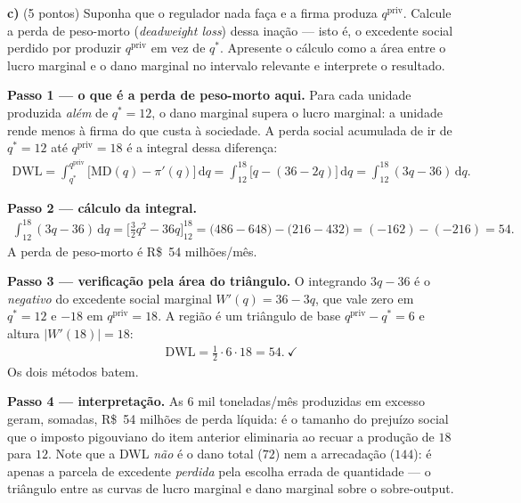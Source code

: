 \textbf{c)} (5 pontos) Suponha que o regulador nada faça e a firma produza $q^{\text{priv}}$. Calcule a perda de peso-morto (\emph{deadweight loss}) dessa inação — isto é, o excedente social perdido por produzir $q^{\text{priv}}$ em vez de $q^{*}$. Apresente o cálculo como a área entre o lucro marginal e o dano marginal no intervalo relevante e interprete o resultado.
\resolucaobox{5.5cm}
\begin{solucao}
\textbf{Passo 1 — o que é a perda de peso-morto aqui.} Para cada unidade produzida \emph{além} de $q^{*}=12$, o dano marginal supera o lucro marginal: a unidade rende menos à firma do que custa à sociedade. A perda social acumulada de ir de $q^{*}=12$ até $q^{\text{priv}}=18$ é a integral dessa diferença:
\begin{align*}
\text{DWL}=\int_{q^{*}}^{q^{\text{priv}}}\big[\text{MD}(q)-\pi'(q)\big]\,\mathrm{d}q=\int_{12}^{18}\big[q-(36-2q)\big]\,\mathrm{d}q=\int_{12}^{18}(3q-36)\,\mathrm{d}q.
\end{align*}

\textbf{Passo 2 — cálculo da integral.}
\begin{align*}
\int_{12}^{18}(3q-36)\,\mathrm{d}q=\Big[\tfrac{3}{2}q^{2}-36q\Big]_{12}^{18}=\big(486-648\big)-\big(216-432\big)=(-162)-(-216)=54.
\end{align*}
A perda de peso-morto é R\$~54 milhões/mês.

\textbf{Passo 3 — verificação pela área do triângulo.} O integrando $3q-36$ é o \emph{negativo} do excedente social marginal $W'(q)=36-3q$, que vale zero em $q^{*}=12$ e $-18$ em $q^{\text{priv}}=18$. A região é um triângulo de base $q^{\text{priv}}-q^{*}=6$ e altura $|W'(18)|=18$:
\begin{align*}
\text{DWL}=\tfrac{1}{2}\cdot 6\cdot 18=54.\ \checkmark
\end{align*}
Os dois métodos batem.

\textbf{Passo 4 — interpretação.} As $6$ mil toneladas/mês produzidas em excesso geram, somadas, R\$~54 milhões de perda líquida: é o tamanho do prejuízo social que o imposto pigouviano do item anterior eliminaria ao recuar a produção de $18$ para $12$. Note que a DWL \emph{não} é o dano total ($72$) nem a arrecadação ($144$): é apenas a parcela de excedente \emph{perdida} pela escolha errada de quantidade — o triângulo entre as curvas de lucro marginal e dano marginal sobre o sobre-output.


\end{solucao}
